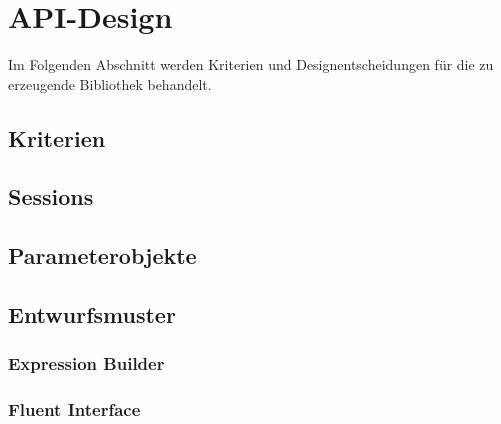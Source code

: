 \section{API-Design}
\label{sec:api-design}

Im Folgenden Abschnitt werden Kriterien und Designentscheidungen für die zu erzeugende Bibliothek behandelt. 

\subsection{Kriterien}
\label{sec:design_criterias}

\subsection{Sessions}
\label{sec:sessions}

\subsection{Parameterobjekte}
\label{sec:parameter_objects}

\subsection{Entwurfsmuster}
\label{sec:patterns}

\subsubsection{Expression Builder}
\label{sec:expression_builder}

\subsubsection{Fluent Interface}
\label{sec:fluent_interface}
